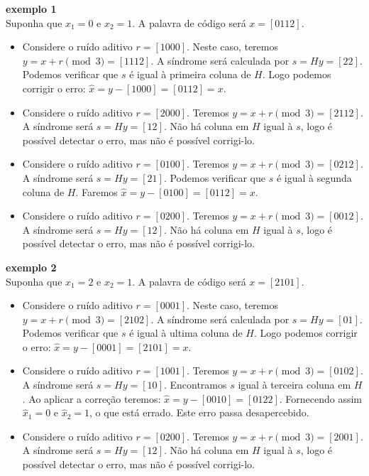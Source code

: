 \begin{questions}
\begin{solution}
\textbf{exemplo 1}\\
Suponha que $x_1 = 0$ e $x_2 = 1$. A palavra de código será $x = [0 1 1 2]$.
\begin{itemize} 
\item Considere o ruído aditivo $r = [1 0 0 0]$. Neste caso, teremos $y = x + r \pmod{3} = [1 1 1 2]$.
A síndrome será calculada por $s = Hy = [2 2]$. Podemos verificar que $s$ é igual à primeira coluna de
$H$. Logo podemos corrigir o erro: $\hat{x} = y - [1 0 0 0] = [0 1 1 2] = x$.

\item Considere o ruído aditivo $r = [2 0 0 0]$. Teremos $y = x + r \pmod{3} = [2 1 1 2]$.
A síndrome será $s = Hy = [1 2]$. Não há coluna em $H$ igual à $s$, logo é possível detectar o
erro, mas não é possível corrigi-lo.

\item Considere o ruído aditivo $r = [0 1 0 0]$. Teremos $y = x + r \pmod{3} = [0 2 1 2]$.
A síndrome será $s = Hy = [2 1]$. Podemos verificar que $s$ é igual à segunda coluna de $H$.
Faremos $\hat{x} = y - [0 1 0 0] = [0 1 1 2] = x$.

\item Considere o ruído aditivo $r = [0 2 0 0]$. Teremos $y = x + r \pmod{3} = [0 0 1 2]$.
A síndrome será $s = Hy = [1 2]$. Não há coluna em $H$ igual à $s$, logo é possível detectar o
erro, mas não é possível corrigi-lo.
\end{itemize}

\textbf{exemplo 2}\\
Suponha que $x_1 = 2$ e $x_2 = 1$. A palavra de código será $x = [2 1 0 1]$.
\begin{itemize}
\item Considere o ruído aditivo $r = [0 0 0 1]$. Neste caso, teremos $y = x + r \pmod{3} = [2 1 0 2]$.
A síndrome será calculada por $s = Hy = [0 1]$. Podemos verificar que $s$ é igual à ultima coluna de
$H$. Logo podemos corrigir o erro: $\hat{x} = y - [0 0 0 1] = [2 1 0 1] = x$.

\item Considere o ruído aditivo $r = [1 0 0 1]$. Teremos $y = x + r \pmod{3} = [0 1 0 2]$.
A síndrome será $s = Hy = [1 0]$. Encontramos $s$ igual à terceira coluna em $H$.
Ao aplicar a correção teremos: $\hat{x} = y - [0 0 1 0] = [0 1 2 2]$. Fornecendo
assim $\hat{x}_1 = 0$ e $\hat{x}_2 = 1$, o que está errado. Este erro passa desapercebido.

\item Considere o ruído aditivo $r = [0 2 0 0]$. Teremos $y = x + r \pmod{3} = [2 0 0 1]$.
A síndrome será $s = Hy = [1 2]$. Não há coluna em $H$ igual à $s$, logo é possível detectar o
erro, mas não é possível corrigi-lo.


\end{itemize}
\end{solution}
\end{questions}
